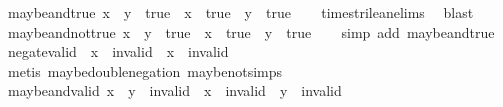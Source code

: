 \begin{isabellebody}
{\isafoldproof}%
%
\isadelimproof
\isanewline
%
\endisadelimproof
\isanewline
{}\isamarkupfalse%
\ maybe{\isacharunderscore}and{\isacharunderscore}true{\isacharcolon}\ {\isachardoublequoteopen}{\isacharparenleft}x\ {\isasymand}\isactrlsub {\isacharquery}\ y\ {\isacharequal}\ true{\isacharparenright}\ {\isacharequal}\ {\isacharparenleft}x\ {\isacharequal}\ true\ {\isasymand}\ y\ {\isacharequal}\ true{\isacharparenright}{\isachardoublequoteclose}\isanewline
%
\isadelimproof
\ \ %
\endisadelimproof
%
\isatagproof
{}\isamarkupfalse%
\ times{\isacharunderscore}trilean{\isachardot}elims\ \isamarkupfalse%
\ blast%
\endisatagproof
{\isafoldproof}%
%
\isadelimproof
\isanewline
%
\endisadelimproof
\isanewline
{}\isamarkupfalse%
\ maybe{\isacharunderscore}and{\isacharunderscore}not{\isacharunderscore}true{\isacharcolon}\ {\isachardoublequoteopen}{\isacharparenleft}x\ {\isasymand}\isactrlsub {\isacharquery}\ y\ {\isasymnoteq}\ true{\isacharparenright}\ {\isacharequal}\ {\isacharparenleft}x\ {\isasymnoteq}\ true\ {\isasymor}\ y\ {\isasymnoteq}\ true{\isacharparenright}{\isachardoublequoteclose}\isanewline
%
\isadelimproof
\ \ %
\endisadelimproof
%
\isatagproof
{}\isamarkupfalse%
\ {\isacharparenleft}simp\ add{\isacharcolon}\ maybe{\isacharunderscore}and{\isacharunderscore}true{\isacharparenright}%
\endisatagproof
{\isafoldproof}%
%
\isadelimproof
\isanewline
%
\endisadelimproof
\isanewline
{}\isamarkupfalse%
\ negate{\isacharunderscore}valid{\isacharcolon}\ {\isachardoublequoteopen}{\isacharparenleft}{\isasymnot}\isactrlsub {\isacharquery}\ x\ {\isasymnoteq}\ invalid{\isacharparenright}\ {\isacharequal}\ {\isacharparenleft}x\ {\isasymnoteq}\ invalid{\isacharparenright}{\isachardoublequoteclose}\isanewline
%
\isadelimproof
\ \ %
\endisadelimproof
%
\isatagproof
{}\isamarkupfalse%
\ {\isacharparenleft}metis\ maybe{\isacharunderscore}double{\isacharunderscore}negation\ maybe{\isacharunderscore}not{\isachardot}simps{\isacharparenleft}{}{\isacharparenright}{\isacharparenright}%
\endisatagproof
{\isafoldproof}%
%
\isadelimproof
\isanewline
%
\endisadelimproof
\isanewline
{}\isamarkupfalse%
\ maybe{\isacharunderscore}and{\isacharunderscore}valid{\isacharcolon}\ {\isachardoublequoteopen}x\ {\isasymand}\isactrlsub {\isacharquery}\ y\ {\isasymnoteq}\ invalid\ {\isasymLongrightarrow}\ x\ {\isasymnoteq}\ invalid\ {\isasymand}\ y\ {\isasymnoteq}\ invalid{\isachardoublequoteclose}\isanewline
%
\isadelimproof
\ \ %
\endisadelimproof
%
\isatagproof
{}\isamarkupfalse%

\end{isabellebody}
